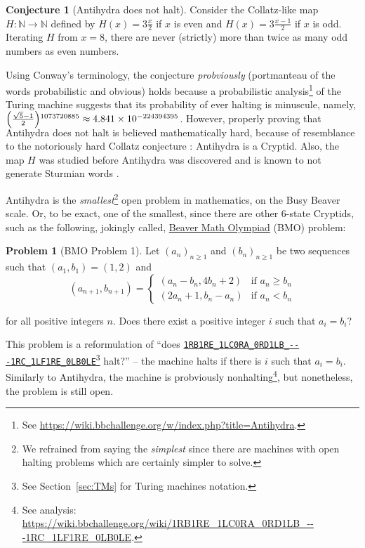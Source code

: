 \documentclass[a4paper,british]{article}
\theoremstyle{definition} %
\newtheorem{conjecture}{Conjecture}[section]
\newtheorem{problem}{Problem}[section]
\numberwithin{equation}{section}
\theoremstyle{definition} %
\newcommand{\tm}[1]{\href{https://bbchallenge.org/#1}{\texttt{\nolinkurl{#1}}}}
\begin{document}
\begin{conjecture}[Antihydra does not halt]
    Consider the Collatz-like map $H: \mathbb{N} \to \mathbb{N}$ defined by $H(x) = 3\frac{x}{2}$ if $x$ is even and $H(x) = 3\frac{x-1}{2}$ if $x$ is odd. Iterating $H$ from $x=8$, there are never (strictly) more than twice as many odd numbers as even numbers.
\end{conjecture}

Using Conway's terminology, the conjecture \textit{probviously} (portmanteau of the words probabilistic and obvious) holds because a probabilistic analysis\footnote{See \url{https://wiki.bbchallenge.org/w/index.php?title=Antihydra}.} of the Turing machine suggests that its probability of ever halting is minuscule, namely, $\smash{\left(\frac{\sqrt{5}-1}{2}\right)}^{1073720885}\approx 4.841\times 10^{-224394395}$. However, properly proving that Antihydra does not halt is believed mathematically hard, because of resemblance to the notoriously hard Collatz conjecture \cite{LagariasCollatz}: Antihydra is a Cryptid. Also, the map $H$ was studied before Antihydra was discovered and is known to not generate Sturmian words \cite{DUBICKAS_2009}.

Antihydra is the \textit{smallest}\footnote{We refrained from saying the \textit{simplest} since there are machines with open halting problems which are certainly simpler to solve.} open problem in mathematics, on the Busy Beaver scale. Or, to be exact, one of the smallest, since there are other 6-state Cryptids, such as the following, jokingly called, \href{https://wiki.bbchallenge.org/wiki/Beaver_Math_Olympiad}{Beaver Math Olympiad} (BMO) problem:

\begin{problem}[BMO Problem 1]
Let $(a_n)_{n \ge 1}$ and $(b_n)_{n \ge 1}$ be two sequences such that $(a_1, b_1) = (1, 2)$ and
$$(a_{n+1}, b_{n+1}) = \begin{cases}
        (a_n-b_n, 4b_n+2) & \text{if }a_n \ge b_n \\
        (2a_n+1, b_n-a_n) & \text{if }a_n < b_n
    \end{cases}$$

\noindent for all positive integers $n$. Does there exist a positive integer $i$ such that $a_i = b_i$?
\end{problem}

This problem is a reformulation of  ``does \tm{1RB1RE_1LC0RA_0RD1LB_---1RC_1LF1RE_0LB0LE}\footnote{See Section~\ref{sec:TMs} for Turing machines notation.} halt?'' -- the machine halts if there is $i$ such that $a_i = b_i$. Similarly to Antihydra, the machine is probviously nonhalting\footnote{See analysis: {\scriptsize \url{https://wiki.bbchallenge.org/wiki/1RB1RE_1LC0RA_0RD1LB_---1RC_1LF1RE_0LB0LE}}. }, but nonetheless, the problem is still open.
\end{document}
